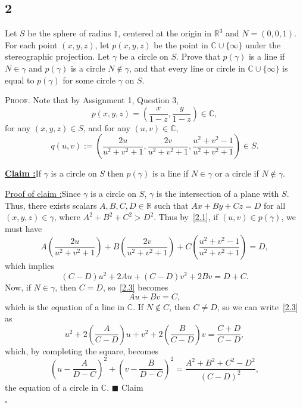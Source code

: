 \documentclass[12pt]{article}
\newcounter{ProofCounter}
\newcounter{ClaimCounter}[ProofCounter]
\newenvironment{Proof}{\stepcounter{ProofCounter}\textsc{Proof.}}{\hfill$\square$}
\newenvironment{claim}[1]{\vspace{1mm}\stepcounter{ClaimCounter}\par\noindent\underline{\bf Claim \theClaimCounter:}\space#1}{}
\newenvironment{claimproof}[1]{\par\noindent\underline{Proof of claim \theClaimCounter:}\space#1}{\hfill $\blacksquare$ Claim \theClaimCounter}
\begin{document}
\subsection*{2}
\begin{tcolorbox}
  Let $S$ be the sphere of radius $1$, centered at the origin in $\mathbb{R}^{3}$ and $N = (0,0,1)$. For each point $(x,y,z)$, let $p(x,y,z)$ be the
  point in $\mathbb{C}\cup \{\infty\}$ under the stereographic projection. Let $\gamma$ be a circle on $S$. Prove that $p(\gamma)$ is a line if
  $N \in \gamma$ and $p(\gamma)$ is a circle $N\notin \gamma$, and that every line or circle in $\mathbb{C}\cup\{\infty\}$ is equal to $p(\gamma)$ for
  some circle $\gamma$ on $S$.
\end{tcolorbox}
\begin{Proof}
  Note that by Assignment 1, Question 3,
  \begin{equation}
    p(x,y,z) = \left( \frac{x}{1 - z}, \frac{y}{1 - z}\right) \in \mathbb{C},
    \label{2.1}
  \end{equation}
  for any $(x,y,z) \in S$, and for any $(u,v) \in \mathbb{C}$,
  \begin{equation}
    q(u,v) := \left( \frac{2u}{u^{2} + v^{2} + 1}, \frac{2v}{u^{2} + v^{2} + 1}, \frac{u^{2} + v^{2} -1}{u^{2} + v^{2} + 1}\right) \in S. 
    \label{2.2}
  \end{equation}
  \begin{claim}
    If $\gamma$ is a circle on $S$ then $p(\gamma)$ is a line if $N \in \gamma$ or a circle if $N \notin \gamma$.
  \end{claim}
  \begin{claimproof}
    Since $\gamma$ is a circle on $S$, $\gamma$ is the intersection of a plane with $S$. Thus, there exists scalars $A,B,C,D \in \mathbb{R}$ such that 
    $Ax + By + Cz = D$ for all $(x,y,z) \in \gamma$, where $A^2 + B^2 + C^2 > D^{2}$. Thus by~\eqref{2.1}, if $(u,v) \in p(\gamma)$, we must have
    \[ A\left( \frac{2u}{u^{2} + v^{2} + 1} \right) + B\left( \frac{2v}{u^{2} + v^{2} + 1} \right) + C\left( \frac{u^{2} + v^{2} - 1}{u^{2} + v^{2} +
    1}\right) = D, \]
    which implies 
    \begin{equation}
      (C - D)u^{2} + 2Au + (C-D)v^{2} + 2Bv = D + C. 
      \label{2.3}
    \end{equation}
    Now, if $N \in \gamma$, then $C = D$, so~\eqref{2.3} becomes 
    \begin{equation}
      Au + Bv = C, 
      \label{2.4}
    \end{equation}
    which is the equation of a line in $\mathbb{C}$. If $N \notin C$, then $C \neq D$,
    so we can write~\eqref{2.3} as 
    \[ u^{2} + 2\left( \frac{A}{C - D}\right)u + v^{2} + 2\left( \frac{B}{C-D} \right)v = \frac{C + D}{C - D}, \]
    which, by completing the square, becomes 
    \begin{equation}
      \left( u - \frac{A}{D - C} \right)^{2} + \left( v - \frac{B}{D - C} \right)^{2} = \frac{A^2 + B^2 + C^2 - D^2}{(C - D)^{2}}, 
      \label{2.5}
    \end{equation}
    the equation of a circle in $\mathbb{C}$.
  \end{claimproof}


\end{Proof}
\end{document}
